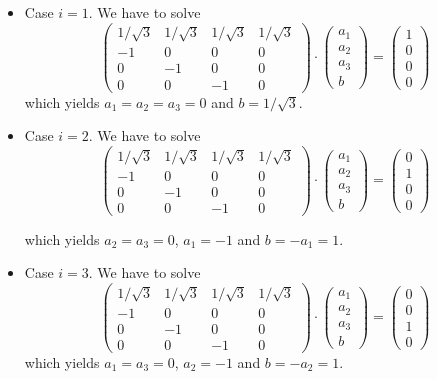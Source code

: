 \begin{itemize}
\item Case $i=1$. We have to solve
\[
\left(\begin{array}{cccc}
1/\sqrt3 & 1/\sqrt3 & 1/\sqrt3 & 1/\sqrt3 \\
-1 & 0 & 0 & 0 \\
0 & -1 & 0 & 0 \\
0 & 0 & -1 & 0
\end{array}\right)
\cdot
\left(\begin{array}{c}
a_1 \\ a_2 \\ a_3 \\ b
\end{array}\right)
=
\left(\begin{array}{c}
1 \\ 0 \\ 0 \\ 0
\end{array}\right)
\]
which yields $a_1=a_2=a_3=0$ and $b=1/\sqrt3$.

\item Case $i=2$. We have to solve
\[
\left(\begin{array}{cccc}
1/\sqrt3 & 1/\sqrt3 & 1/\sqrt3 & 1/\sqrt3 \\
-1 & 0 & 0 & 0 \\
0 & -1 & 0 & 0 \\
0 & 0 & -1 & 0
\end{array}\right)
\cdot
\left(\begin{array}{c}
a_1 \\ a_2 \\ a_3 \\ b
\end{array}\right)
=
\left(\begin{array}{c}
0 \\ 1 \\ 0 \\ 0
\end{array}\right)
\]

which yields $a_2=a_3=0$, $a_1=-1$ and $b=-a_1=1$.

\item Case $i=3$. We have to solve
\[
\left(\begin{array}{cccc}
1/\sqrt3 & 1/\sqrt3 & 1/\sqrt3 & 1/\sqrt3 \\
-1 & 0 & 0 & 0 \\
0 & -1 & 0 & 0 \\
0 & 0 & -1 & 0
\end{array}\right)
\cdot
\left(\begin{array}{c}
a_1 \\ a_2 \\ a_3 \\ b
\end{array}\right)
=
\left(\begin{array}{c}
0 \\ 0 \\ 1 \\ 0
\end{array}\right)
\]
which yields $a_1=a_3=0$, $a_2=-1$ and $b=-a_2=1$.


\end{itemize}
